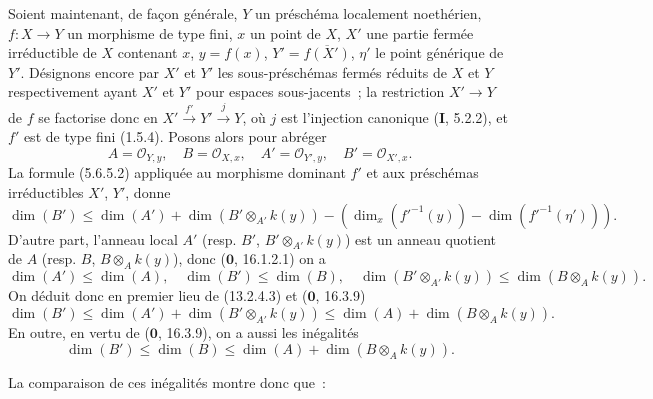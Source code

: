 \begin{env}[13.2.4]
\label{IV.13.2.4-fr}
Soient maintenant, de façon générale, $Y$ un préschéma localement noethérien,
$f:X\to Y$ un morphisme de type fini, $x$ un point de $X$, $X'$ une partie
fermée irréductible de $X$ contenant $x$, $y=f(x)$,
$Y'=\overline{f(X')}$, $\eta'$ le point générique de $Y'$. Désignons encore
par $X'$ et $Y'$ les sous-préschémas fermés réduits de $X$ et $Y$
respectivement ayant $X'$ et $Y'$ pour espaces sous-jacents~; la restriction
$X'\to Y$ de $f$ se factorise donc en
$X'\xrightarrow{f'}Y'\xrightarrow{j}Y$, où $j$ est l'injection canonique
(\textbf{I}, 5.2.2), et $f'$ est de type fini (1.5.4). Posons alors pour
abréger
\[
\tag{13.2.4.1}
\label{IV.13.2.4.1-fr}
  A=\mathcal O_{Y,y},\quad B=\mathcal O_{X,x},\quad
  A'=\mathcal O_{Y',y},\quad B'=\mathcal O_{X',x}.
\]
La formule (5.6.5.2) appliquée au morphisme dominant $f'$ et aux préschémas
irréductibles $X'$, $Y'$, donne
\[
\tag{13.2.4.2}
\label{IV.13.2.4.2-fr}
  \dim(B')\leq\dim(A')+\dim(B'\otimes_{A'}k(y))
  -(\dim_x(f'^{-1}(y))-\dim(f'^{-1}(\eta'))).
\]
D'autre part, l'anneau local $A'$ (resp. $B'$, $B'\otimes_{A'}k(y)$) est un
anneau quotient de $A$ (resp. $B$, $B\otimes_Ak(y)$), donc
($\mathbf 0$, 16.1.2.1) on a
\[
\tag{13.2.4.3}
\label{IV.13.2.4.3-fr}
  \dim(A')\leq\dim(A),\quad \dim(B')\leq\dim(B),\quad
  \dim(B'\otimes_{A'}k(y))\leq\dim(B\otimes_Ak(y)).
\]
On déduit donc en premier lieu de (13.2.4.3) et ($\mathbf 0$, 16.3.9)
\[
\tag{13.2.4.4}
\label{IV.13.2.4.4-fr}
  \dim(B')\leq\dim(A')+\dim(B'\otimes_{A'}k(y))
  \leq\dim(A)+\dim(B\otimes_Ak(y)).
\]
En outre, en vertu de ($\mathbf 0$, 16.3.9), on a aussi les inégalités
\[
\tag{13.2.4.5}
\label{IV.13.2.4.5-fr}
  \dim(B')\leq\dim(B)\leq\dim(A)+\dim(B\otimes_Ak(y)).
\]
\end{env}

La comparaison de ces inégalités montre donc que~:


